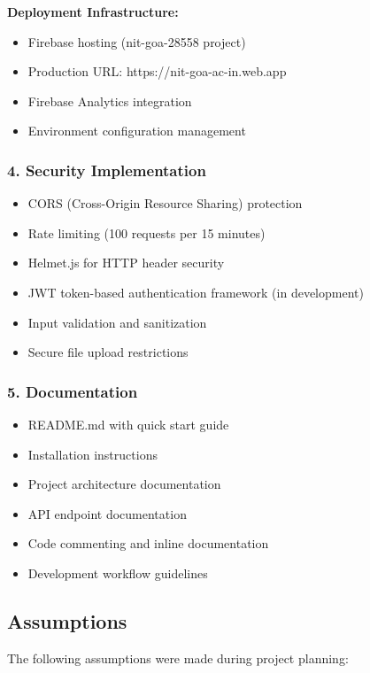 \documentclass[12pt,a4paper]{report}
\begin{document}
\textbf{Deployment Infrastructure:}
\begin{itemize}
    \item Firebase hosting (nit-goa-28558 project)
    \item Production URL: https://nit-goa-ac-in.web.app
    \item Firebase Analytics integration
    \item Environment configuration management
\end{itemize}

\subsubsection*{4. Security Implementation}
\begin{itemize}
    \item CORS (Cross-Origin Resource Sharing) protection
    \item Rate limiting (100 requests per 15 minutes)
    \item Helmet.js for HTTP header security
    \item JWT token-based authentication framework (in development)
    \item Input validation and sanitization
    \item Secure file upload restrictions
\end{itemize}

\subsubsection*{5. Documentation}
\begin{itemize}
    \item README.md with quick start guide
    \item Installation instructions
    \item Project architecture documentation
    \item API endpoint documentation
    \item Code commenting and inline documentation
    \item Development workflow guidelines
\end{itemize}
\subsection*{Assumptions}

The following assumptions were made during project planning:
\end{document}
